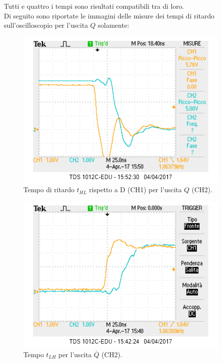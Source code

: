 \documentclass[10pt,a4paper]{article}
\begin{document}
Tutti e quattro i tempi sono risultati compatibili tra di loro.\\

Di seguito sono riportate le immagini delle misure dei tempi di ritardo sull'oscilloscopio per l'uscita $Q$ solamente:\\

\begin{figure}[!htb]
\centering
\includegraphics[scale=1.0]{tphlQ.png}
\caption{Tempo di ritardo  $t_{HL}$ rispetto a D (CH1) per l'uscita $Q$ (CH2).\label{q1}}
\end{figure}

\begin{figure}[!htb]
\centering
\includegraphics[scale=1.0]{tplhQ.png}
\caption{Tempo $t_{LH}$ per l'uscita $\bar{Q}$ (CH2).\label{q2}}
\end{figure}
\end{document}

